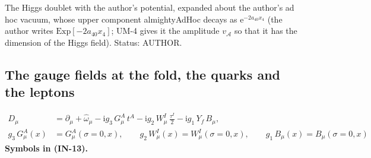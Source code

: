 \documentclass[
  10pt,
]{article}
\begin{document}
The Higgs doublet with the author's potential, expanded about the
author's ad hoc vacuum, whose upper component almightyAdHoc decays as
\(\mathrm{e}^{-2a_{40}x_4}\) (the author writes
\(\mathrm{Exp}[-2a_{40}x_4]\); UM-4 gives it the amplitude
\(v_{\mathcal{A}}\) so that it has the dimension of the Higgs field).
Status: AUTHOR.

\hypertarget{the-gauge-fields-at-the-fold-the-quarks-and-the-leptons}{%
\subsection{The gauge fields at the fold, the quarks and the
leptons}\label{the-gauge-fields-at-the-fold-the-quarks-and-the-leptons}}

\[
\begin{aligned}
D_\mu &= \partial_\mu + \hat\omega_\mu - \mathrm{i}g_3\,G^A_\mu\,t^A - \mathrm{i}g_2\,W^I_\mu\,\frac{\tau^I}{2}
 - \mathrm{i}g_1\,Y_f\,B_\mu,\\
g_3\,G^A_\mu(x) &= G^A_\mu(\sigma = 0, x),\qquad g_2\,W^I_\mu(x) = W^I_\mu(\sigma = 0, x),\qquad g_1\,B_\mu(x) = B_\mu(\sigma = 0, x)
\end{aligned} \tag{IN-13}
\] \textbf{Symbols in (IN-13).}
\end{document}

